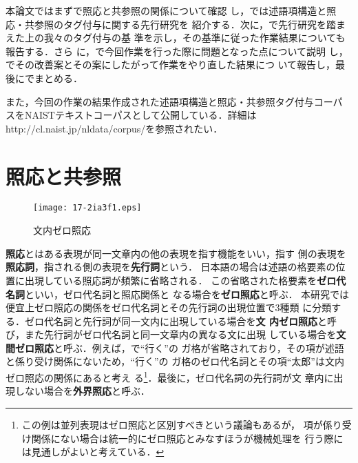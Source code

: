 \documentclass[japanese]{jnlp_1.4}
\def\sec#1{}
\def\fig#1{}
\begin{document}
本論文ではまず\sec{second}で照応と共参照の関係について確認
し，\sec{third}では述語項構造と照応・共参照のタグ付与に関する先行研究を
紹介する．次に，\sec{fourth}で先行研究を踏まえた上の我々のタグ付与の基
準を示し，その基準に従った作業結果についても報告する．さら
に，\sec{fifth}で今回作業を行った際に問題となった点について説明
し，\sec{fifth}でその改善案とその案にしたがって作業をやり直した結果につ
いて報告し，最後に\sec{seventh}でまとめる．

また，今回の作業の結果作成された述語項構造と照応・共参照タグ付与コーパ
スをNAISTテキストコーパスとして公開している．詳細は{http://cl.naist.jp/nldata/corpus/}を参照されたい．







\section{照応と共参照}
\label{sec:second}

\begin{figure}[b]
\begin{center}
\texttt{[image: 17-2ia3f1.eps]}
\end{center}
\caption{文内ゼロ照応}
\label{fig:zero}
\end{figure}

\textbf{照応}とはある表現が同一文章内の他の表現を指す機能をいい，指す
側の表現を\textbf{照応詞}，指される側の表現を\textbf{先行詞}という．
日本語の場合は述語の格要素の位置に出現している照応詞が頻繁に省略される．
この省略された格要素を\textbf{ゼロ代名詞}といい，ゼロ代名詞と照応関係と
なる場合を\textbf{ゼロ照応}と呼ぶ．
本研究では便宜上ゼロ照応の関係をゼロ代名詞とその先行詞の出現位置で3種類
に分類する．ゼロ代名詞と先行詞が同一文内に出現している場合を\textbf{文
内ゼロ照応}と呼び，また先行詞がゼロ代名詞と同一文章内の異なる文に出現
している場合を\textbf{文間ゼロ照応}と呼ぶ．例えば，\fig{zero}で``行く''の
ガ格が省略されており，その項が述語と係り受け関係にないため，``行く''の
ガ格のゼロ代名詞とその項``太郎''は文内ゼロ照応の関係にあると考え
る\footnote{この例は並列表現はゼロ照応と区別すべきという議論もあるが，
  項が係り受け関係にない場合は統一的にゼロ照応とみなすほうが機械処理を
  行う際には見通しがよいと考えている．}．最後に，ゼロ代名詞の先行詞が文
章内に出現しない場合を\textbf{外界照応}と呼ぶ．
\end{document}
